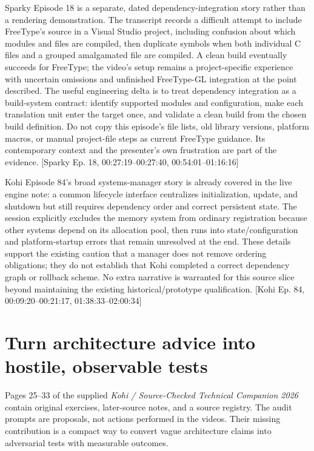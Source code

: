 Sparky Episode 18 is a separate, dated dependency-integration story rather than a rendering demonstration. The transcript records a difficult attempt to include FreeType's source in a Visual Studio project, including confusion about which modules and files are compiled, then duplicate symbols when both individual C files and a grouped amalgamated file are compiled. A clean build eventually succeeds for FreeType; the video's setup remains a project-specific experience with uncertain omissions and unfinished FreeType-GL integration at the point described. The useful engineering delta is to treat dependency integration as a build-system contract: identify supported modules and configuration, make each translation unit enter the target once, and validate a clean build from the chosen build definition. Do not copy this episode's file lists, old library versions, platform macros, or manual project-file steps as current FreeType guidance. Its contemporary context and the presenter's own frustration are part of the evidence. {[}Sparky Ep. 18, 00:27:19--00:27:40, 00:54:01--01:16:16{]}

Kohi Episode 84's broad systems-manager story is already covered in the live engine note: a common lifecycle interface centralizes initialization, update, and shutdown but still requires dependency order and correct persistent state. The session explicitly excludes the memory system from ordinary registration because other systems depend on its allocation pool, then runs into state/configuration and platform-startup errors that remain unresolved at the end. These details support the existing caution that a manager does not remove ordering obligations; they do not establish that Kohi completed a correct dependency graph or rollback scheme. No extra narrative is warranted for this source slice beyond maintaining the existing historical/prototype qualification. {[}Kohi Ep. 84, 00:09:20--00:21:17, 01:38:33--02:00:34{]}

\section{Turn architecture advice into hostile, observable tests}\label{06-engine-ii-ch046-turn-architecture-advice-into-hostile-observable-tests}

Pages 25--33 of the supplied \emph{Kohi / Source-Checked Technical Companion 2026} contain original exercises, later-source notes, and a source registry. The audit prompts are proposals, not actions performed in the videos. Their missing contribution is a compact way to convert vague architecture claims into adversarial tests with measurable outcomes.

